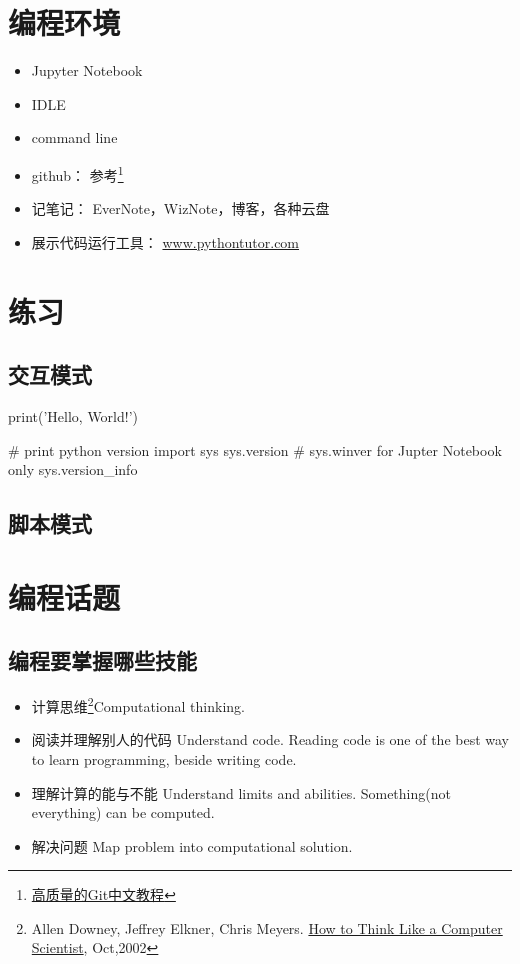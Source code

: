 \section{编程环境}
\begin{itemize}
\item Jupyter Notebook
\item IDLE
\item command line
\item github： 参考\footnote{\protect\href{https://github.com/geeeeeeeeek/git-recipes}{高质量的Git中文教程}} 
\item 记笔记： EverNote，WizNote，博客，各种云盘
\item 展示代码运行工具： \url{www.pythontutor.com}
\end{itemize}

\section{练习}
\subsection{交互模式}
\begin{python}
  print('Hello, World!')

  # print python version
  import sys
  sys.version
  # sys.winver for Jupter Notebook only
  sys.version_info
\end{python}
\subsection{脚本模式}

\section{编程话题}
\subsection{编程要掌握哪些技能}
\begin{itemize}
\item 计算思维\footnote{Allen Downey, Jeffrey Elkner, Chris
    Meyers. \protect\href{http://openbookproject.net/thinkcs/python/english3e/index.html}{How
      to Think Like a Computer Scientist}, Oct,2002}Computational
  thinking.
\item 阅读并理解别人的代码 Understand code.  Reading code is one of the
  best way to learn programming, beside writing code.
\item 理解计算的能与不能 Understand limits and abilities.  Something(not
  everything) can be computed. %
\item 解决问题 Map problem into computational solution.　
\end{itemize}
